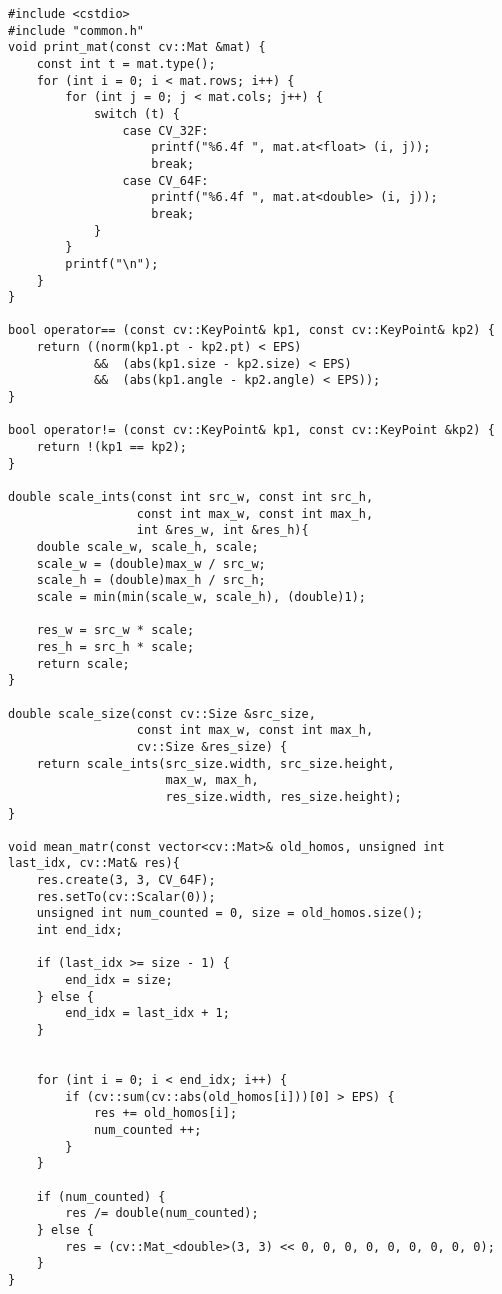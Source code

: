 \begin{lstlisting}
#include <cstdio>
#include "common.h"
void print_mat(const cv::Mat &mat) {
    const int t = mat.type();
    for (int i = 0; i < mat.rows; i++) {
        for (int j = 0; j < mat.cols; j++) {
            switch (t) {
                case CV_32F:
                    printf("%6.4f ", mat.at<float> (i, j));
                    break;
                case CV_64F:
                    printf("%6.4f ", mat.at<double> (i, j));
                    break;
            }
        }
        printf("\n");
    }
}

bool operator== (const cv::KeyPoint& kp1, const cv::KeyPoint& kp2) {
    return ((norm(kp1.pt - kp2.pt) < EPS)
            &&	(abs(kp1.size - kp2.size) < EPS)
            &&	(abs(kp1.angle - kp2.angle) < EPS));
}

bool operator!= (const cv::KeyPoint& kp1, const cv::KeyPoint &kp2) {
    return !(kp1 == kp2);
}

double scale_ints(const int src_w, const int src_h, 
                  const int max_w, const int max_h, 
                  int &res_w, int &res_h){
    double scale_w, scale_h, scale;
	scale_w = (double)max_w / src_w;
	scale_h = (double)max_h / src_h;
	scale = min(min(scale_w, scale_h), (double)1);
    
	res_w = src_w * scale;
    res_h = src_h * scale;
	return scale;
}

double scale_size(const cv::Size &src_size, 
                  const int max_w, const int max_h,
                  cv::Size &res_size) {
    return scale_ints(src_size.width, src_size.height,
                      max_w, max_h,
                      res_size.width, res_size.height);
}

void mean_matr(const vector<cv::Mat>& old_homos, unsigned int last_idx, cv::Mat& res){
    res.create(3, 3, CV_64F);
    res.setTo(cv::Scalar(0));
    unsigned int num_counted = 0, size = old_homos.size();
    int end_idx;
    
    if (last_idx >= size - 1) {
        end_idx = size;
    } else {
        end_idx = last_idx + 1;
    }
    
    
    for (int i = 0; i < end_idx; i++) {
        if (cv::sum(cv::abs(old_homos[i]))[0] > EPS) {
            res += old_homos[i];
            num_counted ++;
        }
    }
    
    if (num_counted) {
        res /= double(num_counted);
    } else {
        res = (cv::Mat_<double>(3, 3) << 0, 0, 0, 0, 0, 0, 0, 0, 0);
    }
}

\end{lstlisting}
